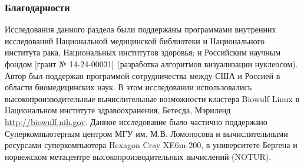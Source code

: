 \subsubsection{Благодарности}
Исследования данного раздела были поддержаны программами внутренних исследований Национальной медицинской библиотеки и Национального института рака, Национальных институтов здоровья; и Российским научным фондом [грант № 14-24-00031] (разработка алгоритмов визуализации нуклеосом). Автор был поддержан программой сотрудничества между США и Россией в области биомедицинских наук. В этом исследовании использовались высокопроизводительные вычислительные возможности кластера Biowulf Linux в Национальном институте здравоохранения, Бетесда, Мэриленд \url{http://biowulf.nih.gov}. Данное исследование было частично поддержано Суперкомпьютерным центром МГУ им. М.В. Ломоносова и вычислительными ресурсами суперкомпьютера Hexagon Cray XE6m-200, в университете Бергена и норвежском метацентре высокопроизводительных вычислений (NOTUR).








